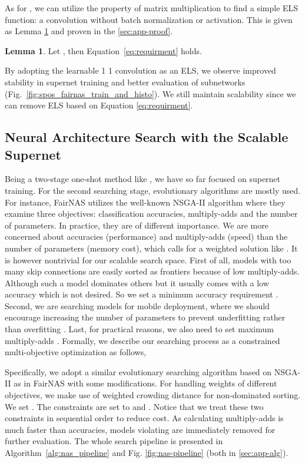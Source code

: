 \documentclass[10pt,twocolumn,letterpaper]{article}
\theoremstyle{definition}
\newtheorem{lemma}[theorem]{Lemma}
\begin{document}
As for , we can utilize the property of matrix multiplication to find a simple ELS function:  a  convolution without batch normalization or activation. This is given as Lemma \ref{lem:els} and proven in the \ref{sec:app-proof}.

\begin{lemma}\label{lem:els}
	Let , then Equation~\ref{eq:requirment} holds. 
	
\end{lemma}

By adopting the learnable 1  1 convolution as an ELS, we observe improved stability in supernet training and better evaluation of subnetworks (Fig.~\ref{fig:spos_fairnas_train_and_histo}). We still maintain scalability since we can remove ELS based on Equation \ref{eq:requirment}. 


\subsection{Neural Architecture Search with the Scalable Supernet}
Being a two-stage one-shot method like \cite{bender2018understanding,guo2019single,chu2019fairnas}, we have so far focused on supernet training. For the second searching stage, evolutionary algorithms are mostly used. For instance, FairNAS \cite{chu2019fairnas} utilizes the well-known NSGA-II algorithm \cite{deb2002fast} where they examine three objectives: classification accuracies, multiply-adds and the number of parameters. In practice, they are of different importance. We are more concerned  about accuracies (performance) and multiply-adds (speed) than the number of parameters (memory cost), which calls for a weighted solution like \cite{chu2019moga}.  It is however nontrivial for our scalable search space. First of all, models with too many skip connections are easily sorted as frontiers because of low multiply-adds. Although such a model dominates others but it usually comes with a low accuracy which is not desired. So we set a minimum accuracy requirement . Second, we are searching models for mobile deployment, where we should encourage increasing the number of parameters to prevent underfitting rather than overfitting \cite{zhang2018shufflenet}. Last, for practical reasons, we also need to set maximum multiply-adds . Formally, we describe our searching process as a constrained multi-objective optimization as follows,



Specifically, we adopt a similar evolutionary searching algorithm based on NSGA-II \cite{deb2002fast} as in FairNAS \cite{chu2019fairnas} with some modifications. For handling weights of different objectives, we make use of weighted crowding distance \cite{friedrich2011weighted} for non-dominated sorting. We set . The constraints are set to  and . Notice that we treat these two constraints in sequential order to reduce cost. As calculating multiply-adds is much faster than accuracies, models violating  are immediately removed for further evaluation. The whole search pipeline is presented in Algorithm~\ref{alg:nas_pipeline} and Fig. \ref{fig:nas-pipeline} (both in \ref{sec:app-alg}). 
\end{document}
